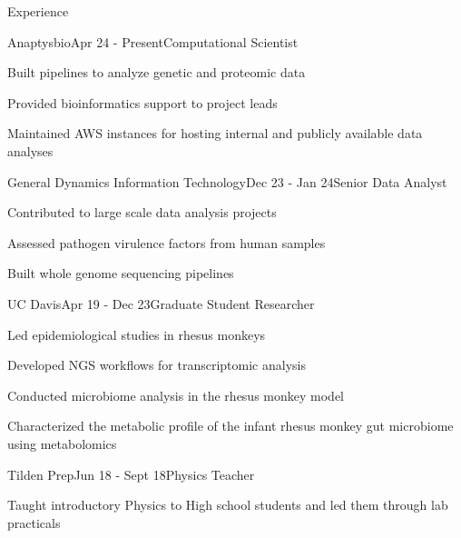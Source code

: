 \documentclass{resume} %
\begin{document}
\begin{rSection}{Experience}

\begin{rSubsection}{Anaptysbio}{Apr 24 - Present}{Computational Scientist}{}

\item Built pipelines to analyze genetic and proteomic data
\item Provided bioinformatics support to project leads
\item Maintained AWS instances for hosting internal and publicly available data analyses

\end{rSubsection}

\begin{rSubsection}{General Dynamics Information Technology}{Dec 23 - Jan 24}{Senior Data Analyst}{}

\item Contributed to large scale data analysis projects
\item Assessed pathogen virulence factors from human samples
\item Built whole genome sequencing pipelines

\end{rSubsection}


\begin{rSubsection}{UC Davis}{Apr 19 - Dec 23}{Graduate Student Researcher}{}

\item Led epidemiological studies in rhesus monkeys
\item Developed NGS workflows for transcriptomic analysis
\item Conducted microbiome analysis in the rhesus monkey model
\item Characterized the metabolic profile of the infant rhesus monkey gut microbiome using metabolomics

\end{rSubsection}


\begin{rSubsection}{Tilden Prep}{Jun 18 - Sept 18}{Physics Teacher}{}

\item Taught introductory Physics to High school students and led them through lab practicals

\end{rSubsection}
\end{rSection}
\end{document}
